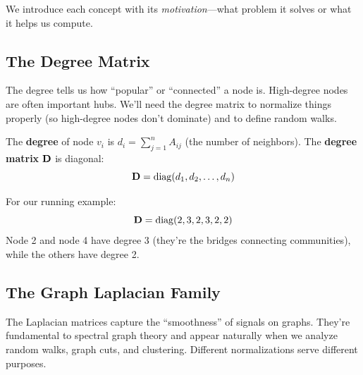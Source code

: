 \begin{notechapter}
We introduce each concept with its \emph{motivation}---what problem it solves or what it helps us compute.

\subsection{The Degree Matrix}

\begin{whybox}
The degree tells us how ``popular'' or ``connected'' a node is. High-degree nodes are often important hubs. We'll need the degree matrix to normalize things properly (so high-degree nodes don't dominate) and to define random walks.
\end{whybox}

\begin{definition}
The \textbf{degree} of node $v_i$ is $d_i = \sum_{j=1}^{n} A_{ij}$ (the number of neighbors). The \textbf{degree matrix} $\mathbf{D}$ is diagonal:
\[
\mathbf{D} = \mathrm{diag}(d_1, d_2, \ldots, d_n)
\]
\end{definition}

\begin{example}
For our running example:
\[
\mathbf{D} = \mathrm{diag}(2, 3, 2, 3, 2, 2)
\]
Node 2 and node 4 have degree 3 (they're the bridges connecting communities), while the others have degree 2.

\begin{center}
\end{center}
\end{example}

\subsection{The Graph Laplacian Family}

\begin{whybox}
The Laplacian matrices capture the ``smoothness'' of signals on graphs. They're fundamental to spectral graph theory and appear naturally when we analyze random walks, graph cuts, and clustering. Different normalizations serve different purposes.
\end{whybox}


\end{notechapter}
